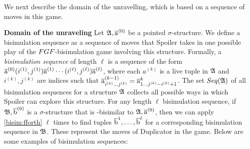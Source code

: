 \noindent
We next describe the domain of the unravelling, which is based on a sequence of moves in this game.

\noindent \textbf{Domain of the unraveling}
Let ${\mathfrak{A}}, \overline{\mathrm{a}}^{(0)}$ be a pointed $\sigma$-structure.
We define a bisimulation sequence as a sequence of moves that Spoiler takes in one possible play of the $\FGF$-bisimulation game involving this structure.
Formally, a \emph{bisimulation sequence} of length $\ell$ is a sequence of the form $\overline{\mathrm{a}}^{(0)}(i^{(1)}, j^{(1)})\overline{\mathrm{a}}^{(1)}\cdots(i^{(\ell)}, j^{(\ell)})\overline{\mathrm{a}}^{(\ell)}$, where each $a^{(k)}$ is a live tuple in ${\mathfrak{A}}$ and $i^{(k)}, j^{(k)}$ are indices such that $\overline{\mathrm{a}}_{i^{(k)}\ldots j^{(k)}}^{(k-1)} = \overline{\mathrm{a}}_{1\ldots j^{(k)}-i^{(k)}+1}^{k}$.
The set $\Seq{A}$ of all bisimulation sequences for a structure ${\mathfrak{A}}$ collects all possible ways in which Spoiler can explore this structure.
For any length $\ell$ bisimulation sequence, if ${\mathfrak{B}}, \overline{\mathrm{b}}^{(0)}$ is a $\sigma$-structure that is \FGF-bisimilar to ${\mathfrak{A}}, \overline{\mathrm{a}}^{(0)}$, then we can apply \ref{bisim:fforth} $\ell$ times to find tuples $\overline{\mathrm{b}}^{1}, \ldots, \overline{\mathrm{b}}^{\ell}$ for a corresponding bisimulation sequence in ${\mathfrak{B}}$.
These represent the moves of Duplicator in the game.
Below are some examples of bisimulation sequences:
